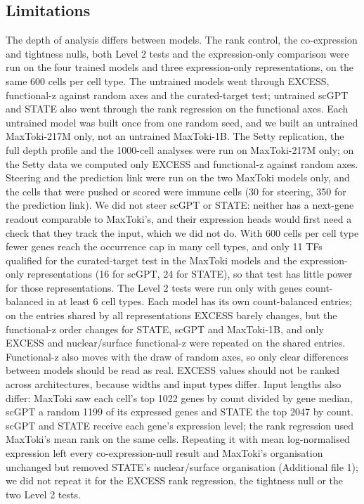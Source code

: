 \documentclass[
  11pt,
]{article}
\begin{document}
\subsection{Limitations}\label{limitations}

The depth of analysis differs between models. The rank control, the
co-expression and tightness nulls, both Level 2 tests and the
expression-only comparison were run on the four trained models and three
expression-only representations, on the same 600 cells per cell type.
The untrained models went through EXCESS, functional-z against random
axes and the curated-target test; untrained scGPT and STATE also went
through the rank regression on the functional axes. Each untrained model
was built once from one random seed, and we built an untrained
MaxToki-217M only, not an untrained MaxToki-1B. The Setty replication,
the full depth profile and the 1000-cell analyses were run on
MaxToki-217M only; on the Setty data we computed only EXCESS and
functional-z against random axes. Steering and the prediction link were
run on the two MaxToki models only, and the cells that were pushed or
scored were immune cells (30 for steering, 350 for the prediction link).
We did not steer scGPT or STATE: neither has a next-gene readout
comparable to MaxToki's, and their expression heads would first need a
check that they track the input, which we did not do. With 600 cells per
cell type fewer genes reach the occurrence cap in many cell types, and
only 11 TFs qualified for the curated-target test in the MaxToki models
and the expression-only representations (16 for scGPT, 24 for STATE), so
that test has little power for those representations. The Level 2 tests
were run only with genes count-balanced in at least 6 cell types. Each
model has its own count-balanced entries; on the entries shared by all
representations EXCESS barely changes, but the functional-z order
changes for STATE, scGPT and MaxToki-1B, and only EXCESS and
nuclear/surface functional-z were repeated on the shared entries.
Functional-z also moves with the draw of random axes, so only clear
differences between models should be read as real. EXCESS values should
not be ranked across architectures, because widths and input types
differ. Input lengths also differ: MaxToki saw each cell's top 1022
genes by count divided by gene median, scGPT a random 1199 of its
expressed genes and STATE the top 2047 by count. scGPT and STATE receive
each gene's expression level; the rank regression used MaxToki's mean
rank on the same cells. Repeating it with mean log-normalised expression
left every co-expression-null result and MaxToki's organisation
unchanged but removed STATE's nuclear/surface organisation (Additional
file 1); we did not repeat it for the EXCESS rank regression, the
tightness null or the two Level 2 tests.
\end{document}
